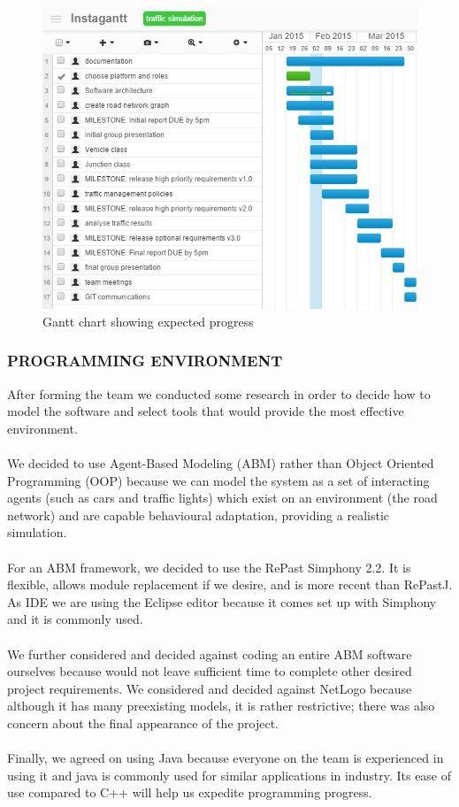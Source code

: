 \documentclass[11pt]{article}
\begin{document}
\begin{figure}[gantt8Feb]
	\includegraphics[scale=0.9]{gantt8Feb}
	\caption{Gantt chart showing expected progress}
	\centering

\end{figure}


\subsubsection*{PROGRAMMING ENVIRONMENT}

After forming the team we conducted some research in order to decide how to model the software and select tools that would provide the most effective environment.
\\ \\
We decided to use Agent-Based Modeling (ABM) rather than Object Oriented Programming (OOP) because we can model the system as a set of interacting agents (such as cars and traffic lights) which exist on an environment (the road network) and are capable behavioural adaptation, providing a realistic simulation.
\\ \\
For an ABM framework, we decided to use the RePast Simphony 2.2. It is flexible, allows module replacement if we desire, and is more recent than RePastJ. As IDE we are using the Eclipse editor because it comes set up with Simphony and it is commonly used.
\\ \\
We further considered and decided against coding an entire ABM software ourselves because would not leave sufficient time 
to complete other desired project requirements. We considered and decided against NetLogo because although it has many preexisting models, it is rather restrictive; there was also concern about the final appearance of the project.
\\ \\
Finally, we agreed on using Java because everyone on the team is experienced in using it and java is commonly used for similar applications in industry. Its ease of use compared to C++ will help us expedite programming progress.
\end{document}
